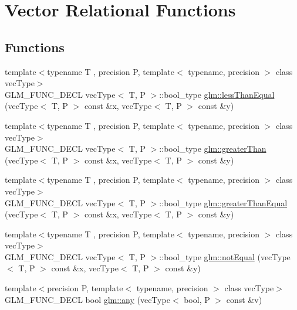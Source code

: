 \hypertarget{group__core__func__vector__relational}{}\section{Vector Relational Functions}
\label{group__core__func__vector__relational}
\subsection*{Functions}
\begin{DoxyCompactItemize}
\item 
{\footnotesize template$<$typename T , precision P, template$<$ typename, precision $>$ class vec\+Type$>$ }\\G\+L\+M\+\_\+\+F\+U\+N\+C\+\_\+\+D\+E\+CL vec\+Type$<$ T, P $>$\+::bool\+\_\+type \hyperlink{group__core__func__vector__relational_ga2167b22ac086c5791a4740932b62b685}{glm\+::less\+Than\+Equal} (vec\+Type$<$ T, P $>$ const \&x, vec\+Type$<$ T, P $>$ const \&y)
\item 
{\footnotesize template$<$typename T , precision P, template$<$ typename, precision $>$ class vec\+Type$>$ }\\G\+L\+M\+\_\+\+F\+U\+N\+C\+\_\+\+D\+E\+CL vec\+Type$<$ T, P $>$\+::bool\+\_\+type \hyperlink{group__core__func__vector__relational_gac9163d451231eb3eaae2c6b3da5add6a}{glm\+::greater\+Than} (vec\+Type$<$ T, P $>$ const \&x, vec\+Type$<$ T, P $>$ const \&y)
\item 
{\footnotesize template$<$typename T , precision P, template$<$ typename, precision $>$ class vec\+Type$>$ }\\G\+L\+M\+\_\+\+F\+U\+N\+C\+\_\+\+D\+E\+CL vec\+Type$<$ T, P $>$\+::bool\+\_\+type \hyperlink{group__core__func__vector__relational_gad1385064aa2fc7aaae37aa95daea9c31}{glm\+::greater\+Than\+Equal} (vec\+Type$<$ T, P $>$ const \&x, vec\+Type$<$ T, P $>$ const \&y)
\item 
{\footnotesize template$<$typename T , precision P, template$<$ typename, precision $>$ class vec\+Type$>$ }\\G\+L\+M\+\_\+\+F\+U\+N\+C\+\_\+\+D\+E\+CL vec\+Type$<$ T, P $>$\+::bool\+\_\+type \hyperlink{group__core__func__vector__relational_ga85d7bc5613c4dcc2d5873ec9d6ed4c19}{glm\+::not\+Equal} (vec\+Type$<$ T, P $>$ const \&x, vec\+Type$<$ T, P $>$ const \&y)
\item 
{\footnotesize template$<$precision P, template$<$ typename, precision $>$ class vec\+Type$>$ }\\G\+L\+M\+\_\+\+F\+U\+N\+C\+\_\+\+D\+E\+CL bool \hyperlink{group__core__func__vector__relational_ga632a2644532d9332011c8860400d30b2}{glm\+::any} (vec\+Type$<$ bool, P $>$ const \&v)

\end{DoxyCompactItemize}

